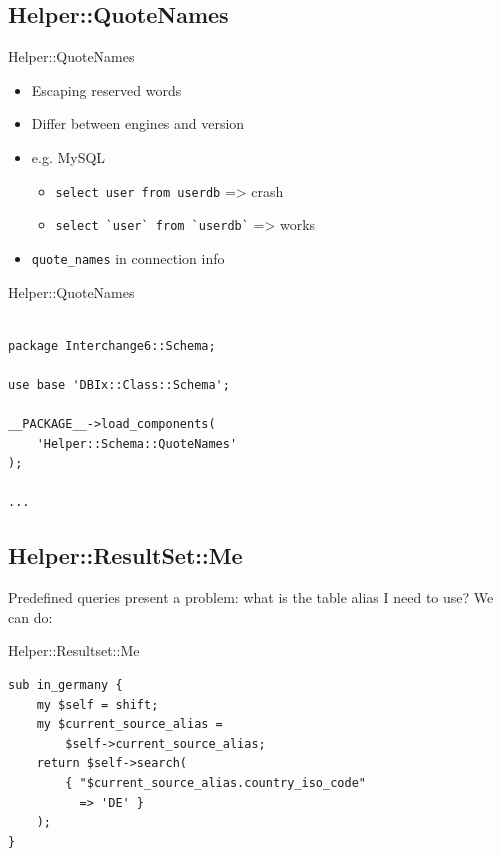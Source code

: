 \subsection{Helper::QuoteNames}

\begin{frame}[fragile]{Helper::QuoteNames}
\begin{itemize}
\item Escaping reserved words
\item Differ between engines and version
\item e.g. MySQL
\begin{itemize}
\item \verb|select user from userdb| => crash
\item \verb|select `user` from `userdb`| => works
\end{itemize}
\item \verb|quote_names| in connection info
\end{itemize}
\end{frame}

\begin{frame}[fragile]{Helper::QuoteNames}
\begin{lstlisting}

package Interchange6::Schema;

use base 'DBIx::Class::Schema';

__PACKAGE__->load_components( 
    'Helper::Schema::QuoteNames' 
);

...

\end{lstlisting}
\end{frame}

\subsection{Helper::ResultSet::Me}

Predefined queries present a problem: what is the table alias I need to use?
We can do:

\begin{frame}[fragile]{Helper::Resultset::Me}
\begin{lstlisting}
sub in_germany {
    my $self = shift;
    my $current_source_alias =
        $self->current_source_alias;
    return $self->search(
        { "$current_source_alias.country_iso_code"
          => 'DE' }
    );
}
\end{lstlisting}
\end{frame}

